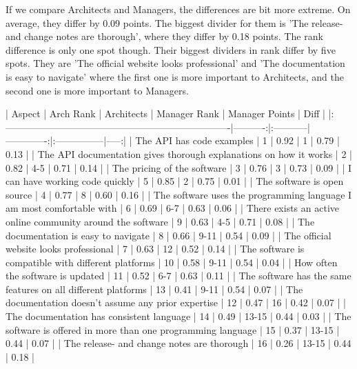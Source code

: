 \documentclass[11pt]{article}
\begin{document}
\begin{multicols}{2}

    If we compare Architects and Managers, the differences are bit more
    extreme. On average, they differ by 0.09 points. The biggest divider for
    them is 'The release- and change notes are thorough', where they differ
    by 0.18 points. The rank difference is only one spot though. Their
    biggest dividers in rank differ by five spots. They are 'The official
    website looks professional' and 'The documentation is easy to navigate'
    where the first one is more important to Architects, and the second one
    is more important to Managers.

    |                                Aspect                                 | Arch Rank | Architects | Manager Rank | Manager Points | Diff |
    |:----------------------------------------------------------------------|----------:|:-----------|-------------:|:---------------|-----:|
    | The API has code examples                                             |         1 | 0.92       |            1 | 0.79           | 0.13 |
    | The API documentation gives thorough explanations on how it works     |         2 | 0.82       |          4-5 | 0.71           | 0.14 |
    | The pricing of the software                                           |         3 | 0.76       |            3 | 0.73           | 0.09 |
    | I can have working code quickly                                       |         5 | 0.85       |            2 | 0.75           | 0.01 |
    | The software is open source                                           |         4 | 0.77       |            8 | 0.60           | 0.16 |
    | The software uses the programming language I am most comfortable with |         6 | 0.69       |          6-7 | 0.63           | 0.06 |
    | There exists an active online community around the software           |         9 | 0.63       |          4-5 | 0.71           | 0.08 |
    | The documentation is easy to navigate                                 |         8 | 0.66       |         9-11 | 0.54           | 0.09 |
    | The official website looks professional                               |         7 | 0.63       |           12 | 0.52           | 0.14 |
    | The software is compatible with different platforms                   |        10 | 0.58       |         9-11 | 0.54           | 0.04 |
    | How often the software is updated                                     |        11 | 0.52       |          6-7 | 0.63           | 0.11 |
    | The software has the same features on all different platforms         |        13 | 0.41       |         9-11 | 0.54           | 0.07 |
    | The documentation doesn't assume any prior expertise                  |        12 | 0.47       |           16 | 0.42           | 0.07 |
    | The documentation has consistent language                             |        14 | 0.49       |        13-15 | 0.44           | 0.03 |
    | The software is offered in more than one programming language         |        15 | 0.37       |        13-15 | 0.44           | 0.07 |
    | The release- and change notes are thorough                            |        16 | 0.26       |        13-15 | 0.44           | 0.18 |


\end{multicols}
\end{document}
